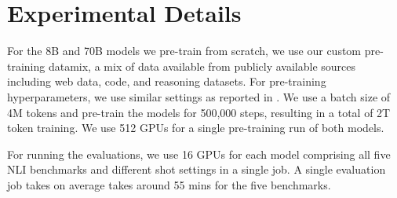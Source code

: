 \section{Experimental Details}
\label{appx:experiments}

For the 8B and 70B models we pre-train from scratch, we use our custom pre-training datamix, a mix of data available from publicly available sources including web data, code, and reasoning datasets. 
For pre-training hyperparameters, we use similar settings as reported in \citet{dubey2024llama}. 
We use a batch size of 4M tokens and pre-train the models for 500,000 steps, resulting in a total of 2T token training. 
We use 512 GPUs for a single pre-training run of both models.

For running the evaluations, we use 16 GPUs for each model comprising all five NLI benchmarks and different shot settings in a single job. 
A single evaluation job takes on average takes around 55 mins for the five benchmarks.
